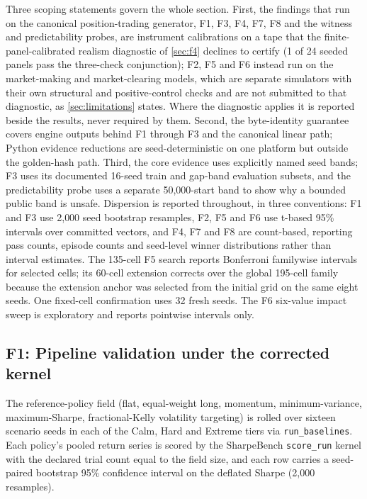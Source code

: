 Three scoping statements govern the whole section. First, the findings that run on the canonical position-trading generator, F1, F3, F4, F7, F8 and the witness and predictability probes, are instrument calibrations on a tape that the finite-panel-calibrated realism diagnostic of \cref{sec:f4} declines to certify (1 of 24 seeded panels pass the three-check conjunction); F2, F5 and F6 instead run on the market-making and market-clearing models, which are separate simulators with their own structural and positive-control checks and are not submitted to that diagnostic, as \cref{sec:limitations} states. Where the diagnostic applies it is reported beside the results, never required by them. Second, the byte-identity guarantee covers engine outputs behind F1 through F3 and the canonical linear path; Python evidence reductions are seed-deterministic on one platform but outside the golden-hash path. Third, the core evidence uses explicitly named seed bands; F3 uses its documented 16-seed train and gap-band evaluation subsets, and the predictability probe uses a separate 50{,}000-start band to show why a bounded public band is unsafe. Dispersion is reported throughout, in three conventions: F1 and F3 use 2{,}000 seed bootstrap resamples, F2, F5 and F6 use t-based 95\% intervals over committed vectors, and F4, F7 and F8 are count-based, reporting pass counts, episode counts and seed-level winner distributions rather than interval estimates. The 135-cell F5 search reports Bonferroni familywise intervals for selected cells; its 60-cell extension corrects over the global 195-cell family because the extension anchor was selected from the initial grid on the same eight seeds. One fixed-cell confirmation uses 32 fresh seeds. The F6 six-value impact sweep is exploratory and reports pointwise intervals only.

\subsection{F1: Pipeline validation under the corrected kernel}\label{sec:f1}

The reference-policy field (flat, equal-weight long, momentum, minimum-variance, maximum-Sharpe, fractional-Kelly volatility targeting) is rolled over sixteen scenario seeds in each of the Calm, Hard and Extreme tiers via \texttt{run\_baselines}. Each policy's pooled return series is scored by the SharpeBench \texttt{score\_run} kernel with the declared trial count equal to the field size, and each row carries a seed-paired bootstrap 95\% confidence interval on the deflated Sharpe (2{,}000 resamples).

